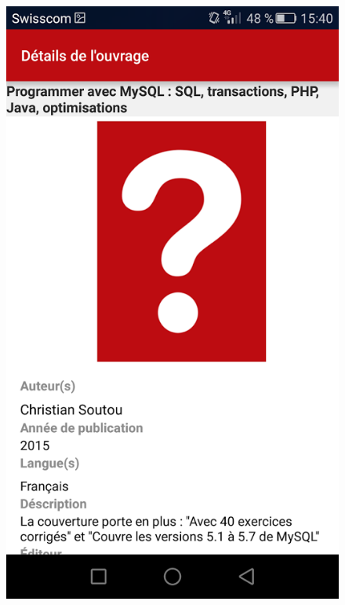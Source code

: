 \documentclass[10pt]{beamer}
\begin{document}
\begin{frame}
\begin{columns}[T]
\begin{column}{.65\textwidth}
\begin{columns}[T]
                \begin{column}{.3\textwidth}
                    \begin{figure}
                        \includegraphics[width=1\textwidth]{images/unnamed3.png}
                    \end{figure}
                \end{column}
            \end{columns}
		\end{column}

\end{columns}
\end{frame}
\end{document}
